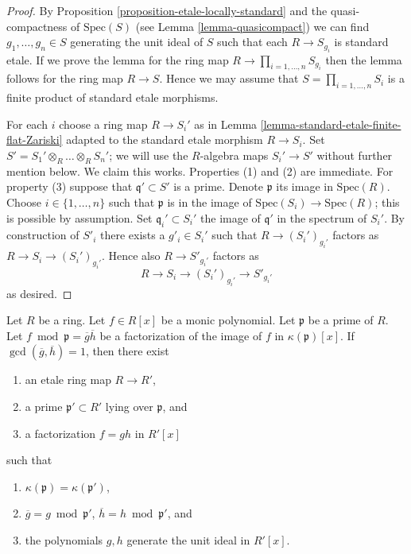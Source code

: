 \begin{proof}
By Proposition \ref{proposition-etale-locally-standard} and
the quasi-compactness of $\text{Spec}(S)$ (see Lemma \ref{lemma-quasicompact})
we can find $g_1, \ldots, g_n \in S$ generating the unit ideal
of $S$ such that each $R \to S_{g_i}$ is standard etale.
If we prove the lemma for the ring map $R \to \prod_{i = 1, \ldots, n} S_{g_i}$
then the lemma follows for the ring map $R \to S$.
Hence we may assume that $S = \prod_{i = 1, \ldots, n} S_i$
is a finite product of standard etale morphisms.

\medskip\noindent
For each $i$ choose a ring map $R \to S_i'$ as in
Lemma \ref{lemma-standard-etale-finite-flat-Zariski}
adapted to the standard etale morphism $R \to S_i$.
Set $S' = S_1' \otimes_R \ldots \otimes_R S_n'$; we will use
the $R$-algebra maps $S_i' \to S'$ without further mention below.
We claim this works. Properties (1) and (2) are immediate.
For property (3) suppose that $\mathfrak q' \subset S'$ is a prime.
Denote $\mathfrak p$ its image in $\text{Spec}(R)$.
Choose $i \in \{1, \ldots, n\}$ such that $\mathfrak p$
is in the image of $\text{Spec}(S_i) \to \text{Spec}(R)$; this is
possible by assumption. Set $\mathfrak q_i' \subset S_i'$
the image of $\mathfrak q'$ in the spectrum of $S_i'$.
By construction of $S'_i$ there exists a $g'_i \in S_i'$
such that $R \to (S_i')_{g_i'}$ factors as
$R \to S_i \to (S_i')_{g_i'}$. Hence also
$R \to S'_{g_i'}$ factors as
$$
R \to S_i \to (S_i')_{g_i'} \to S'_{g_i'}
$$
as desired.
\end{proof}

\begin{lemma}
\label{lemma-factor-mod-lift-etale}
Let $R$ be a ring. Let $f \in R[x]$ be a monic polynomial. Let $\mathfrak p$
be a prime of $R$. Let $f \bmod \mathfrak p = \overline{g} \overline{h}$
be a factorization of the image of $f$ in $\kappa(\mathfrak p)[x]$.
If $\gcd(\overline{g}, \overline{h}) = 1$, then there exist
\begin{enumerate}
\item an etale ring map $R \to R'$,
\item a prime $\mathfrak p' \subset R'$ lying over $\mathfrak p$, and
\item a factorization $f = g h$ in $R'[x]$
\end{enumerate}
such that
\begin{enumerate}
\item $\kappa(\mathfrak p) = \kappa(\mathfrak p')$,
\item $\overline{g} = g \bmod \mathfrak p'$,
$\overline{h} = h \bmod \mathfrak p'$, and
\item the polynomials $g, h$ generate the unit ideal in $R'[x]$.
\end{enumerate}
\end{lemma}

